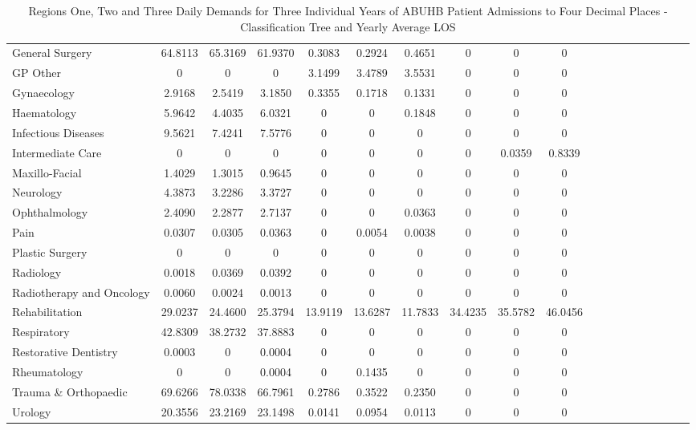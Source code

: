 \documentclass[thesis.tex]{subfiles}
\begin{document}
\begin{landscape}
\begin{table}[h!]
{\begin{tabular}{lcccccccccccccccccc}
General Surgery&	64.8113&	65.3169	&61.9370&	0.3083&	0.2924	&0.4651&	0&	0&	0\\
GP Other	&0	&0	&0	&3.1499&	3.4789	&3.5531&	0	&0&	0\\
Gynaecology&	2.9168	&2.5419	&3.1850&	0.3355&	0.1718&	0.1331	&0	&0&	0\\
Haematology	&5.9642	&4.4035	&6.0321&	0&0&	0.1848&	0	&0	&0\\
Infectious Diseases	&9.5621&	7.4241	&7.5776	&0&	0&	0	&0&	0	&0\\
Intermediate Care	&0	&0	&0&	0&	0&	0	&0&	0.0359	&0.8339\\
Maxillo-Facial	&1.4029	&1.3015&	0.9645&	0&	0&	0&	0&	0	&0\\
Neurology	&4.3873&	3.2286&	3.3727&	0	&0&	0	&0&	0	&0\\
Ophthalmology	&2.4090	&2.2877&	2.7137	&0	&0&0.0363&	0	&0&	0\\
Pain	&0.0307&	0.0305&	0.0363&	0	&0.0054	&0.0038&	0&	0	&0\\
Plastic Surgery&	0	&0&	0&	0	&0&	0&	0&	0	&0\\
Radiology&	0.0018&	0.0369	&0.0392&	0&	0	&0&	0&	0&	0\\
Radiotherapy and Oncology&	0.0060	&0.0024	&0.0013&	0&	0&	0	&0&	0	&0\\
Rehabilitation	&29.0237	&24.4600&	25.3794	&13.9119	&13.6287&	11.7833	&34.4235&	35.5782&	46.0456\\
Respiratory	&42.8309&	38.2732&	37.8883&	0	&0	&0	&0&	0&	0\\
Restorative Dentistry	&0.0003	&0&	0.0004	&0	&0&	0&	0&	0&	0\\
Rheumatology	&0	&0&	0.0004&	0	&0.1435&	0	&0	&0&	0\\
Trauma \& Orthopaedic	&69.6266	&78.0338&	66.7961&	0.2786&	0.3522&	0.2350	&0	&0	&0\\
Urology&	20.3556	&23.2169&	23.1498	&0.0141	&0.0954&	0.0113&	0	&0	&0\\
\bottomrule
\end{tabular}  } 
\caption{Regions One, Two and Three Daily Demands for Three Individual Years of ABUHB Patient Admissions to Four Decimal Places - Classification Tree and Yearly Average LOS}
    \label{apptab:LinkedDemands8a}
\end{table}


\end{landscape}
\end{document}
